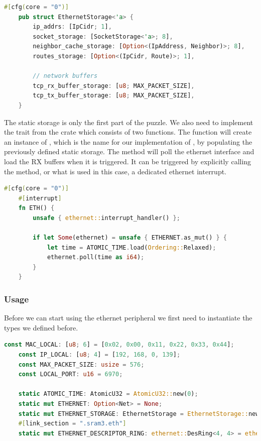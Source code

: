 \begin{lstlisting}[language=Rust,frame=single,float=!ht,style=customrust,label={lst:static-net-storage},caption={Definition of Net Static Storage Type}]
    #[cfg(core = "0")]
    pub struct EthernetStorage<'a> {
        ip_addrs: [IpCidr; 1],
        socket_storage: [SocketStorage<'a>; 8],
        neighbor_cache_storage: [Option<(IpAddress, Neighbor)>; 8],
        routes_storage: [Option<(IpCidr, Route)>; 1],

        // network buffers
        tcp_rx_buffer_storage: [u8; MAX_PACKET_SIZE],
        tcp_tx_buffer_storage: [u8; MAX_PACKET_SIZE],
    }
\end{lstlisting}

The static storage is only the first part of the puzzle. We also need to implement the  trait from the  crate which consists of two functions. The  function will create an instance of , which is the name for our implementation of , by populating the previously defined static storage. The  method will poll the ethernet interface and load the RX buffers when it is triggered. It can be triggered by explicitly calling the method, or what is used in this case, a dedicated ethernet interrupt.

\begin{lstlisting}[language=Rust,frame=single,float=!ht,style=customrust,label={lst:eth-interrup-handler},caption={Ethernet Interrupt Handler}]
    #[cfg(core = "0")]
    #[interrupt]
    fn ETH() {
        unsafe { ethernet::interrupt_handler() };

        if let Some(ethernet) = unsafe { ETHERNET.as_mut() } {
            let time = ATOMIC_TIME.load(Ordering::Relaxed);
            ethernet.poll(time as i64);
        }
    }
\end{lstlisting}

\subsubsection{Usage}

Before we can start using the ethernet peripheral we first need to instantiate the types we defined before.

\begin{lstlisting}[language=Rust,frame=single,float=!ht,style=customrust,label={lst:eth-globals},caption={Global Static Variables Related to Ethernet}]
    const MAC_LOCAL: [u8; 6] = [0x02, 0x00, 0x11, 0x22, 0x33, 0x44];
    const IP_LOCAL: [u8; 4] = [192, 168, 0, 139];
    const MAX_PACKET_SIZE: usize = 576;
    const LOCAL_PORT: u16 = 6970;

    static ATOMIC_TIME: AtomicU32 = AtomicU32::new(0);
    static mut ETHERNET: Option<Net> = None;
    static mut ETHERNET_STORAGE: EthernetStorage = EthernetStorage::new();
    #[link_section = ".sram3.eth"]
    static mut ETHERNET_DESCRIPTOR_RING: ethernet::DesRing<4, 4> = ethernet::DesRing::new();
\end{lstlisting}

